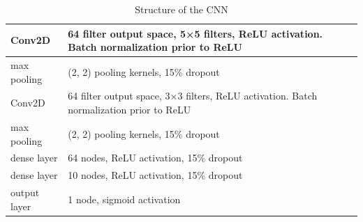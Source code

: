 \documentclass[12pt]{article}
\numberwithin{figure}{section} %
\begin{document}
\begin{table}[H]
\begin{center}
\begin{tabular}{ | m{2cm} | m{8cm} | } 
\hline
Conv2D & 64 filter output space, 5×5 filters, ReLU activation. Batch normalization prior to ReLU \\ 
\hline
max pooling & (2, 2) pooling kernels, 15\% dropout  \\ 
\hline
Conv2D & 64 filter output space, 3×3 filters, ReLU activation. Batch normalization prior to ReLU  \\ 
\hline
max pooling & (2, 2) pooling kernels, 15\% dropout \\ 
\hline
dense layer & 64 nodes, ReLU activation, 15\% dropout  \\ 
\hline
dense layer & 10 nodes, ReLU activation, 15\% dropout  \\ 
\hline
output layer & 1 node, sigmoid activation \\
\hline
\end{tabular}
\caption{Structure of the CNN}
\vspace{-1.5em}
\end{center}
\label{table:CNN structure}
\end{table}
\end{document}
